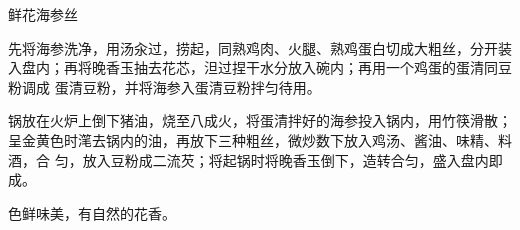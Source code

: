%
%
%
%
%
%
%
\begin{recipe}{鲜花海参丝}

\ingredients


\preparation

\step 先将海参洗净，用汤汆过，捞起，同熟鸡肉、火腿、熟鸡蛋白切成大粗丝，分开装
入盘内；再将晚香玉抽去花芯，泹过捏干水分放入碗内；再用一个鸡蛋的蛋清同豆粉调成
蛋清豆粉，并将海参入蛋清豆粉拌匀待用。

\step 锅放在火炉上倒下猪油，烧至八成火，将蛋清拌好的海参投入锅内，用竹筷滑散；
呈金黄色时滗去锅内的油，再放下三种粗丝，微炒数下放入鸡汤、酱油、味精、料酒，合
匀，放入豆粉成二流芡；将起锅时将晚香玉倒下，造转合匀，盛入盘内即成。

\features

色鲜味美，有自然的花香。

\end{recipe}

